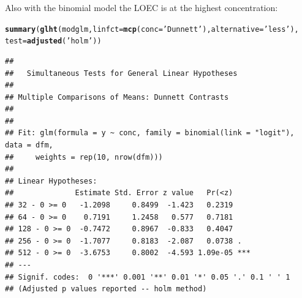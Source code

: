 \documentclass{scrartcl}\usepackage[]{graphicx}\usepackage[]{color}
\makeatletter
\newcommand{\hlstr}[1]{\textcolor[rgb]{0.192,0.494,0.8}{#1}}%
\newcommand{\hlstd}[1]{\textcolor[rgb]{0.345,0.345,0.345}{#1}}%
\newcommand{\hlkwc}[1]{\textcolor[rgb]{0.333,0.667,0.333}{#1}}%
\newcommand{\hlkwd}[1]{\textcolor[rgb]{0.737,0.353,0.396}{\textbf{#1}}}%
\newenvironment{kframe}{%
 \def\at@end@of@kframe{}%
 \ifinner\ifhmode%
  \def\at@end@of@kframe{\end{minipage}}%
  \begin{minipage}{\columnwidth}%
 \fi\fi%
 \def\FrameCommand##1{\hskip\@totalleftmargin \hskip-\fboxsep
 \colorbox{shadecolor}{##1}\hskip-\fboxsep
     \hskip-\linewidth \hskip-\@totalleftmargin \hskip\columnwidth}%
 \MakeFramed {\advance\hsize-\width
   \@totalleftmargin\z@ \linewidth\hsize
   \@setminipage}}%
 {\par\unskip\endMakeFramed%
 \at@end@of@kframe}
\newenvironment{knitrout}{}{} %
\renewenvironment{knitrout}{\begin{spacing}{1}}{\end{spacing}}
\makeatother
\begin{document}
Also with the binomial model the LOEC is at the highest concentration:
\begin{knitrout}
\color{fgcolor}\begin{kframe}
\begin{alltt}
\hlkwd{summary}\hlstd{(}\hlkwd{glht}\hlstd{(modglm,} \hlkwc{linfct} \hlstd{=} \hlkwd{mcp}\hlstd{(}\hlkwc{conc} \hlstd{=} \hlstr{'Dunnett'}\hlstd{),} \hlkwc{alternative} \hlstd{=} \hlstr{'less'}\hlstd{),}
        \hlkwc{test} \hlstd{=} \hlkwd{adjusted}\hlstd{(}\hlstr{'holm'}\hlstd{))}
\end{alltt}
\begin{verbatim}
## 
## 	 Simultaneous Tests for General Linear Hypotheses
## 
## Multiple Comparisons of Means: Dunnett Contrasts
## 
## 
## Fit: glm(formula = y ~ conc, family = binomial(link = "logit"), data = dfm, 
##     weights = rep(10, nrow(dfm)))
## 
## Linear Hypotheses:
##              Estimate Std. Error z value   Pr(<z)    
## 32 - 0 >= 0   -1.2098     0.8499  -1.423   0.2319    
## 64 - 0 >= 0    0.7191     1.2458   0.577   0.7181    
## 128 - 0 >= 0  -0.7472     0.8967  -0.833   0.4047    
## 256 - 0 >= 0  -1.7077     0.8183  -2.087   0.0738 .  
## 512 - 0 >= 0  -3.6753     0.8002  -4.593 1.09e-05 ***
## ---
## Signif. codes:  0 '***' 0.001 '**' 0.01 '*' 0.05 '.' 0.1 ' ' 1
## (Adjusted p values reported -- holm method)
\end{verbatim}
\end{kframe}
\end{knitrout}





\end{document}
